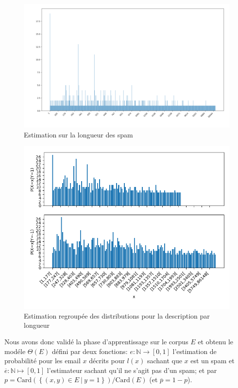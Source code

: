 \documentclass[a4paper, french]{article}
\begin{document}
\begin{figure}[h!]
\begin{center}
    \caption{Estimation sur la longueur des spam}
    \includegraphics[width=13cm]{histo}
\end{center}
\label{fig:histo1spam}
\end{figure}

\begin{figure}[h!]
\begin{center}
    \caption{Estimation regroup\'ee des distributions pour la description par longueur}
    \includegraphics[width=13cm]{histo5}
\end{center}
\label{fig:histo5}
\end{figure}

\pagebreak
Nous avons donc valid\'e la phase d'apprentissage sur le corpus $E$ et obtenu
le mod\'ele $\Theta(E)$ d\'efini par deux fonctions: 
$e\colon\mathbb{N}\rightarrow [0,1]$ l'estimation de probabilit\'e 
pour les email $x$ d\'ecrits pour $l(x)$ sachant que $x$ est un spam
et $\overline{e}\colon\mathbb{N}\mapsto [0,1]$ l'estimateur sachant qu'il ne s'agit
pas d'un spam; et par $p=\text{Card}\left(\left\{(x,y)\in E\ |\ y=1\right\}\right)/%
\text{Card}(E)$ (et $\overline{p}=1-p$).
\end{document}
